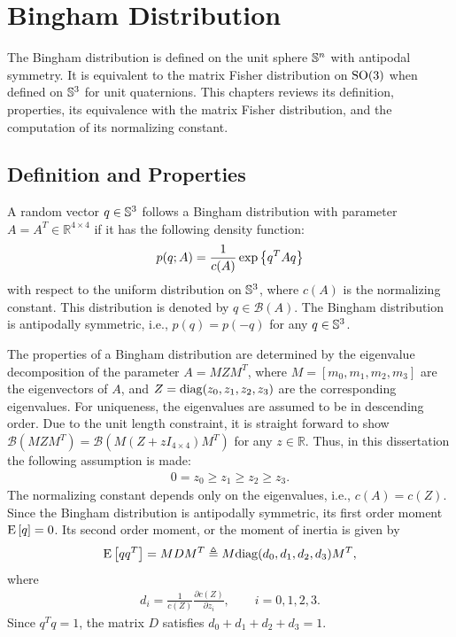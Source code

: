 \section{Bingham Distribution} \label{section:MF-Bingham}

The Bingham distribution is defined on the unit sphere $\mathbb{S}^n$ with antipodal symmetry.
It is equivalent to the matrix Fisher distribution on $\mathrm{SO}(3)$ when defined on $\mathbb{S}^3$ for unit quaternions.
This chapters reviews its definition, properties, its equivalence with the matrix Fisher distribution, and the computation of its normalizing constant.

\subsection{Definition and Properties}

A random vector $q\in\mathbb{S}^3$ follows a Bingham distribution with parameter $A = A^T\in\mathbb{R}^{4\times 4}$ if it has the following density function:
\begin{align} \label{eqn:Bh-density}
	p(q;A) = \frac{1}{c(A)} \exp\left\{ q^TAq \right\}
\end{align}
with respect to the uniform distribution on $\mathbb{S}^3$, where $c(A)$ is the normalizing constant.
This distribution is denoted by $q\in \mathcal{B}(A)$.
The Bingham distribution is antipodally symmetric, i.e., $p(q) = p(-q)$ for any $q\in\mathbb{S}^3$.

The properties of a Bingham distribution are determined by the eigenvalue decomposition of the parameter $A = MZM^T$, where $M = [m_0, m_1, m_2, m_3]$ are the eigenvectors of $A$, and $Z = \mathrm{diag}(z_0,z_1,z_2,z_3)$ are the corresponding eigenvalues.
For uniqueness, the eigenvalues are assumed to be in descending order.
Due to the unit length constraint, it is straight forward to show $\mathcal{B}\left(MZM^T\right) = \mathcal{B}\left(M(Z + zI_{4\times 4})M^T\right)$ for any $z\in\mathbb{R}$.
Thus, in this dissertation the following assumption is made: 
\begin{align}
	0 = z_0 \geq z_1 \geq z_2 \geq z_3.
\end{align}
The normalizing constant depends only on the eigenvalues, i.e., $c(A) = c(Z)$.
Since the Bingham distribution is antipodally symmetric, its first order moment $\mathrm{E}\left[ q \right] = 0$.
Its second order moment, or the moment of inertia is given by
\begin{align} \label{eqn:Bh-Eqq}
	\mathrm{E}\left[ qq^T \right] = MDM^T \triangleq M\mathrm{diag}(d_0,d_1,d_2,d_3)M^T,
\end{align}
where
\begin{align} \label{eqn:Bh-Z2D}
	d_i = \frac{1}{c(Z)} \frac{\partial c(Z)}{\partial z_i}, \qquad i = 0,1,2,3.
\end{align}
Since $q^Tq = 1$, the matrix $D$ satisfies $d_0+d_1+d_2+d_3 = 1$.

